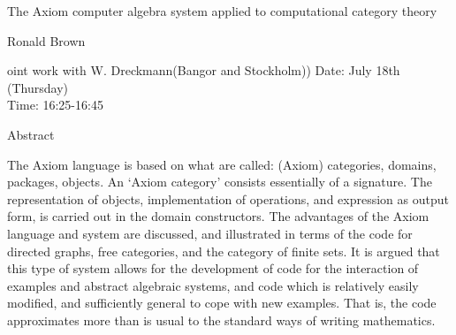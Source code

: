 \begin{center}
\LARGE
The Axiom computer algebra system applied to
                 computational category theory

\end{center}

\begin{center}
\Large
Ronald Brown
\end{center}

\noindent
oint work with W. Dreckmann(Bangor and Stockholm)) 
Date:  July 18th (Thursday)\\
Time:  16:25-16:45\\

\begin{center}
\large
Abstract
\end{center}

The Axiom language is based on what are called: (Axiom) categories, domains, packages, objects.
An `Axiom category' consists essentially of a signature. The representation of objects,
implementation of operations, and expression as output form, is carried out in the domain
constructors. The advantages of the Axiom language and system are discussed, and illustrated in
terms of the code for directed graphs, free categories, and the category of finite sets. It is argued
that this type of system allows for the development of code for the interaction of examples and
abstract algebraic systems, and code which is relatively easily modified, and sufficiently general to
cope with new examples. That is, the code approximates more than is usual to the standard ways of
writing mathematics. 

